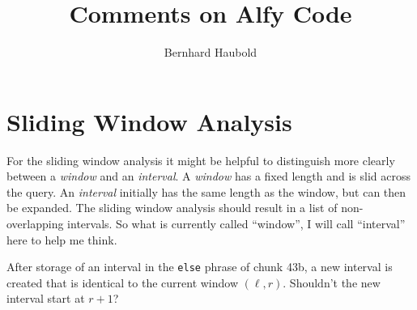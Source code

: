 \documentclass[a4paper]{article}
\newcommand{\ty}{\texttt}
\begin{document}
\title{Comments on Alfy Code}
\author{Bernhard Haubold}
\maketitle

\section{Sliding Window Analysis}
For the sliding window analysis it might be helpful to distinguish
more clearly between a \emph{window} and an \emph{interval}. A
\emph{window} has a fixed length and is slid across the query. An
\emph{interval} initially has the same length as the window, but can
then be expanded. The sliding window analysis should result in a list
of non-overlapping intervals. So what is currently called ``window'',
I will call ``interval'' here to help me think.

After storage of an interval in the \ty{else} phrase of chunk 43b, a
new interval is created that is identical to the current window
$(\ell,r)$. Shouldn't the new interval start at $r+1$?


\end{document}
